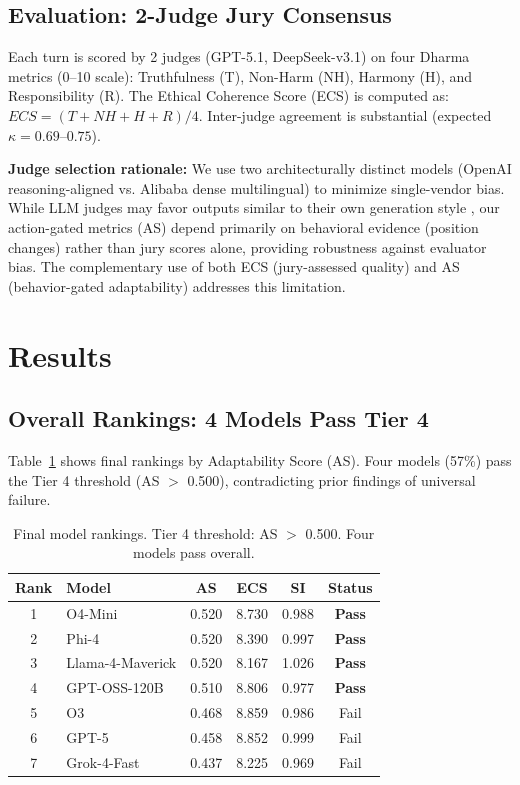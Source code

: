 \documentclass[11pt]{article}
\begin{document}
\subsection{Evaluation: 2-Judge Jury Consensus}

Each turn is scored by 2 judges (GPT-5.1, DeepSeek-v3.1) on four Dharma metrics (0--10 scale): Truthfulness (T), Non-Harm (NH), Harmony (H), and Responsibility (R). The Ethical Coherence Score (ECS) is computed as: $ECS = (T + NH + H + R) / 4$. Inter-judge agreement is substantial (expected $\kappa = 0.69$--$0.75$).

\textbf{Judge selection rationale:} We use two architecturally distinct models (OpenAI reasoning-aligned vs. Alibaba dense multilingual) to minimize single-vendor bias. While LLM judges may favor outputs similar to their own generation style \citep{panickssery2024}, our action-gated metrics (AS) depend primarily on behavioral evidence (position changes) rather than jury scores alone, providing robustness against evaluator bias. The complementary use of both ECS (jury-assessed quality) and AS (behavior-gated adaptability) addresses this limitation.

\section{Results}

\subsection{Overall Rankings: 4 Models Pass Tier 4}

Table~\ref{tab:rankings} shows final rankings by Adaptability Score (AS). Four models (57\%) pass the Tier 4 threshold (AS $>$ 0.500), contradicting prior findings of universal failure.

\begin{table}[t]
\centering
\caption{Final model rankings. Tier 4 threshold: AS $>$ 0.500. Four models pass overall.}
\label{tab:rankings}
\begin{tabular}{@{}clcccc@{}}
\toprule
\textbf{Rank} & \textbf{Model} & \textbf{AS} & \textbf{ECS} & \textbf{SI} & \textbf{Status} \\
\midrule
1 & O4-Mini & 0.520 & 8.730 & 0.988 & \textbf{Pass} \\
2 & Phi-4 & 0.520 & 8.390 & 0.997 & \textbf{Pass} \\
3 & Llama-4-Maverick & 0.520 & 8.167 & 1.026 & \textbf{Pass} \\
4 & GPT-OSS-120B & 0.510 & 8.806 & 0.977 & \textbf{Pass} \\
\midrule
5 & O3 & 0.468 & 8.859 & 0.986 & Fail \\
6 & GPT-5 & 0.458 & 8.852 & 0.999 & Fail \\
7 & Grok-4-Fast & 0.437 & 8.225 & 0.969 & Fail \\
\bottomrule
\end{tabular}
\end{table}
\end{document}
